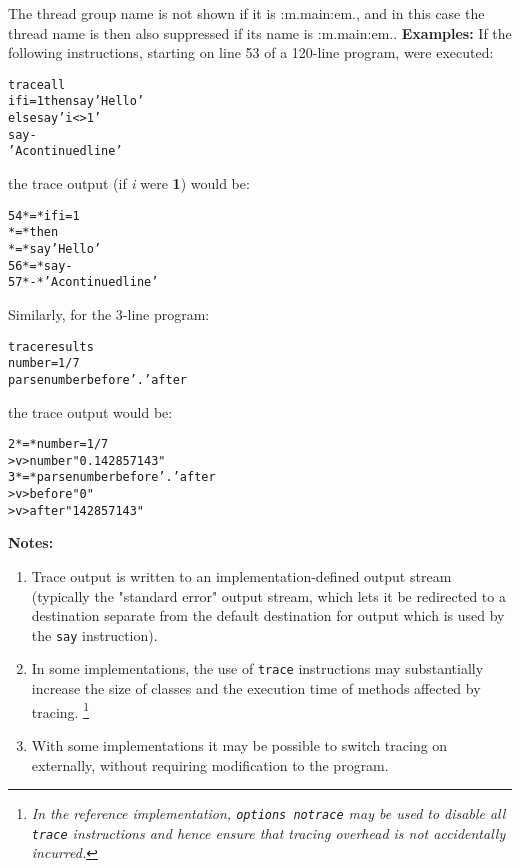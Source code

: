 The thread group name is not shown if it is :m.main:em., and in this
case the thread name is then also suppressed if its name is :m.main:em..
 \textbf{Examples:}
 If the following instructions, starting on line 53 of a 120-line
program, were executed:
\begin{alltt}
trace all
if i=1 then say 'Hello'
       else say 'i<>1'
say -
 'A continued line'
\end{alltt}
the trace output (if \emph{i} were \textbf{1}) would be:
\begin{alltt}
  54 *=* if i=1
     *=*        then
     *=*             say 'Hello'
  56 *=* say -
  57 *-*  'A continued line'
\end{alltt}
 Similarly, for the 3-line program:
\begin{alltt}
trace results
number=1/7
parse number before '.' after
\end{alltt}
the trace output would be:
\begin{alltt}
 2 *=* number=1/7
   >v> number "0.142857143"
 3 *=* parse number before '.' after
   >v> before "0"
   >v> after "142857143"
\end{alltt}
 \textbf{Notes:}
\begin{enumerate}
\item 
Trace output is written to an implementation-defined output stream
(typically the "standard error" output stream, which lets it be
redirected to a destination separate from the default destination for
output which is used by the \texttt{say} instruction).
\item In some implementations, the use of \texttt{trace} instructions
may substantially increase the size of classes and the execution time of
methods affected by tracing.
\footnote{
\emph{In the reference implementation, \texttt{options notrace} may be
used to disable all \texttt{trace} instructions and hence ensure that
tracing overhead is not accidentally incurred.}
}
\item With some implementations it may be possible to switch tracing on
externally, without requiring modification to the program.
\end{enumerate}
